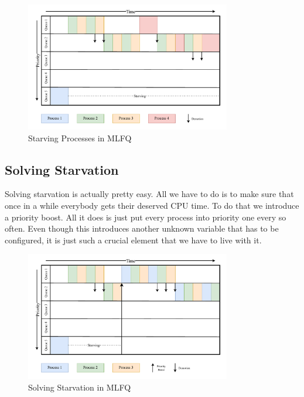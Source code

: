 \begin{figure}[h]
    \centering
    \includegraphics[width=0.8\textwidth]{Assets/MLFQ-Example-3.pdf}
    \caption{Starving Processes in MLFQ}
    \label{fig:mlfq-example-3}
\end{figure}

\subsection{Solving Starvation}

Solving starvation is actually pretty easy.
All we have to do is to make sure that once in a while everybody gets their deserved CPU time.
To do that we introduce a priority boost. All it does is just put every process into priority one every so often.
Even though this introduces another unknown variable that has to be configured, it is just such a crucial element that we have to live with it.

\begin{figure}[h]
    \centering
    \includegraphics[width=0.8\textwidth]{Assets/MLFQ-Example-4.pdf}
    \caption{Solving Starvation in MLFQ}
    \label{fig:mlfq-example-4}
\end{figure}

\newpage

